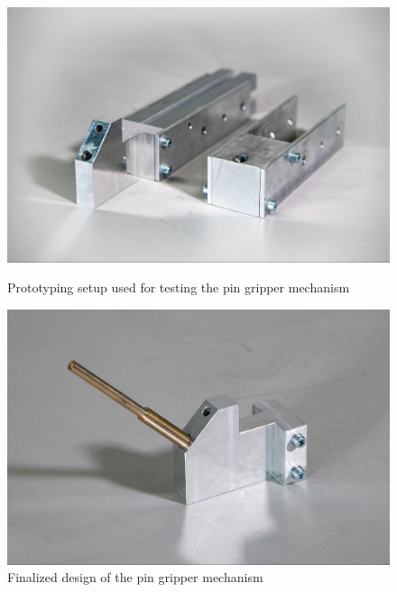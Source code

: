 \begin{figure}[!h]
    \centering
    \begin{minipage}[b]{0.49\textwidth}
        \centering
        \includegraphics[width=\textwidth]{images/7a/img43.jpg}
        \caption{Prototyping setup used for testing the pin gripper mechanism}
        \label{fig:prototyping-pin-gripper-mechanism}
    \end{minipage}
    \hfill
    \begin{minipage}[b]{0.49\textwidth}
        \centering
        \includegraphics[width=\textwidth]{images/7a/img44.jpg}
        \caption{Finalized design of the pin gripper mechanism}
        \label{fig:Finalized-pin-gripper-mechanism}
    \end{minipage}
\end{figure}


